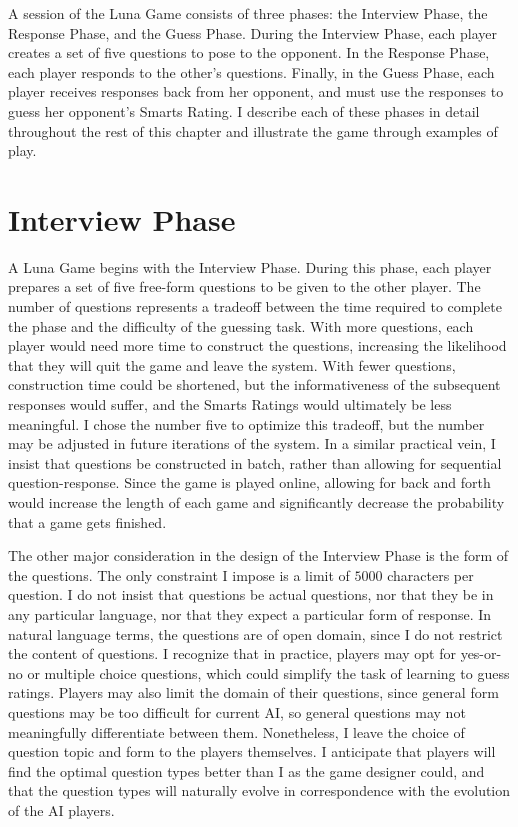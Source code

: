 A session of the Luna Game consists of three phases: the Interview Phase, the Response Phase, and the Guess Phase. During the Interview Phase, each player creates a set of five questions to pose to the opponent. In the Response Phase, each player responds to the other's questions. Finally, in the Guess Phase, each player receives responses back from her opponent, and must use the responses to guess her opponent's Smarts Rating. I describe each of these phases in detail throughout the rest of this chapter and illustrate the game through examples of play.

\section{Interview Phase}

A Luna Game begins with the Interview Phase. During this phase, each player prepares a set of five free-form questions to be given to the other player. The number of questions represents a tradeoff between the time required to complete the phase and the difficulty of the guessing task. With more questions, each player would need more time to construct the questions, increasing the likelihood that they will quit the game and leave the system. With fewer questions, construction time could be shortened, but the informativeness of the subsequent responses would suffer, and the Smarts Ratings would ultimately be less meaningful. I chose the number five to optimize this tradeoff, but the number may be adjusted in future iterations of the system. In a similar practical vein, I insist that questions be constructed in batch, rather than allowing for sequential question-response. Since the game is played online, allowing for back and forth would increase the length of each game and significantly decrease the probability that a game gets finished.

The other major consideration in the design of the Interview Phase is the form of the questions. The only constraint I impose is a limit of $5000$ characters per question. I do not insist that questions be actual questions, nor that they be in any particular language, nor that they expect a particular form of response. In natural language terms, the questions are of open domain, since I do not restrict the content of questions. I recognize that in practice, players may opt for yes-or-no or multiple choice questions, which could simplify the task of learning to guess ratings. Players may also limit the domain of their questions, since general form questions may be too difficult for current AI, so general questions may not meaningfully differentiate between them. Nonetheless, I leave the choice of question topic and form to the players themselves. I anticipate that players will find the optimal question types better than I as the game designer could, and that the question types will naturally evolve in correspondence with the evolution of the AI players.

